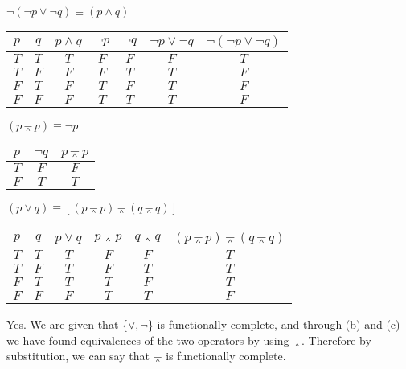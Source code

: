\documentclass[12pt]{exam}
\begin{document}
\begin{solution}
\begin{qparts}
    \item 
    $\lnot (\lnot p \lor \lnot q) \equiv (p \land q)$
    \begin{center}
        \begin{tabular}{c c | c | c |c|c| c}
        $p$ & $q$ & $p \land q$ & $\lnot p$ & $\lnot q$ & $\lnot p \lor \lnot q$ & $\lnot (\lnot p \lor \lnot q)$\\
        \hline
        $T$ & $T$ & $T$ & $F$ & $F$ & $F$ & $T$\\
        $T$ & $F$ & $F$ & $F$ & $T$ & $T$& $F$\\
        $F$ & $T$ & $F$ & $T$ & $F$ & $T$& $F$\\
        $F$ & $F$ & $F$ & $T$ & $T$ & $T$& $F$\\
        \end{tabular}
    \end{center}

    \item 
    $(p \barwedge p) \equiv \lnot p$
    \begin{center}
        \begin{tabular}{c | c | c }
        $p$ & $\lnot q$ & $p \barwedge p$ \\
        \hline
        $T$ & $F$ & $F$\\
        $F$ & $T$ & $T$\\
        \end{tabular}
    \end{center}

    \item 
    $(p \lor q) \equiv [(p \barwedge p) \barwedge (q \barwedge q)]$
    \begin{center}
        \begin{tabular}{c c| c | c | c | c}
        $p$ & $q$ & $p \lor q$ & $p \barwedge p$ & $q \barwedge q$ & $(p \barwedge p) \barwedge (q \barwedge q) $\\
        \hline
        $T$ & $T$ & $T$ & $F$ & $F$ & $T$\\
        $T$ & $F$ & $T$ & $F$ & $T$ & $T$\\
        $F$ & $T$ & $T$ & $T$ & $F$ & $T$\\
        $F$ & $F$ & $F$ & $T$ & $T$ & $F$\\
        \end{tabular}
    \end{center}

    \item Yes. We are given that \{$\lor ,\lnot$\} is functionally complete, and through (b) and (c) we have found equivalences of the two operators by using $\barwedge$. Therefore by substitution, we can say that $\barwedge$ is functionally complete.
\end{qparts}
\end{solution}
\end{document}

